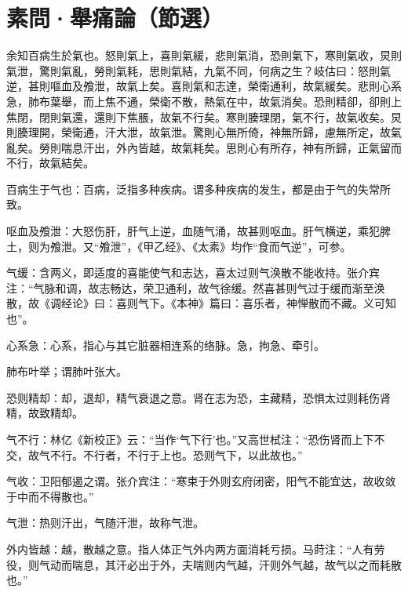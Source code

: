 \documentclass[draft,12pt]{ctexbook}
\begin{document}

\section{素問·舉痛論（節選）}%


\begin{yuanwen}
余知百病生於氣也。怒則氣上，喜則氣緩，悲則氣消，恐則氣下，寒則氣收，炅則氣泄，驚則氣亂，勞則氣耗，思則氣結，九氣不同，何病之生？岐估曰：怒則氣逆，甚則嘔血及飧泄，故氣上矣。喜則氣和志達，榮衛通利，故氣緩矣。悲則心系急，肺布葉舉，而上焦不通，榮衛不散，熱氣在中，故氣消矣。恐則精卻，卻則上焦閉，閉則氣還，還則下焦脹，故氣不行矣。寒則腠理閉，氣不行，故氣收矣。炅則腠理開，榮衛通，汗大泄，故氣泄。驚則心無所倚，神無所歸，慮無所定，故氣亂矣。勞則喘息汗出，外內皆越，故氣耗矣。思則心有所存，神有所歸，正氣留而不行，故氣結矣。
\end{yuanwen}


\begin{jiaozhu}
	\item 百病生于气也：百病，泛指多种疾病。谓多种疾病的发生，都是由于气的失常所致。
	\item 呕血及飧泄：大怒伤肝，肝气上逆，血随气涌，故甚则呕血。肝气横逆，乘犯脾土，则为飧泄。又“飧泄”，《甲乙经》、《太素》均作“食而气逆”，可参。
	\item 气缓：含两义，即适度的喜能使气和志达，喜太过则气涣散不能收持。张介宾注：“气脉和调，故志畅达，荣卫通利，故气徐缓。然喜甚则气过于缓而渐至涣散，故《调经论》曰：喜则气下。《本神》篇曰：喜乐者，神惮散而不藏。义可知也”。
	\item 心系急：心系，指心与其它脏器相连系的络脉。急，拘急、牵引。
	\item 肺布叶举；谓肺叶张大。
	\item 恐则精却：却，退却，精气衰退之意。肾在志为恐，主藏精，恐惧太过则耗伤肾精，故致精却。
	\item 气不行：林亿《新校正》云：“当作‘气下行’也。”又高世栻注：“恐伤肾而上下不交，故气不行。不行者，不行于上也。恐则气下，以此故也。”
	\item 气收：卫阳郁遏之谓。张介宾注：“寒束于外则玄府闭密，阳气不能宜达，故收敛于中而不得散也。”
	\item 气泄：热则汗出，气随汗泄，故称气泄。
	\item 外内皆越：越，散越之意。指人体正气外内两方面消耗亏损。马莳注：“人有劳役，则气动而喘息，其汗必出于外，夫喘则内气越，汗则外气越，故气以之而耗散也。”
\end{jiaozhu}
\end{document}
